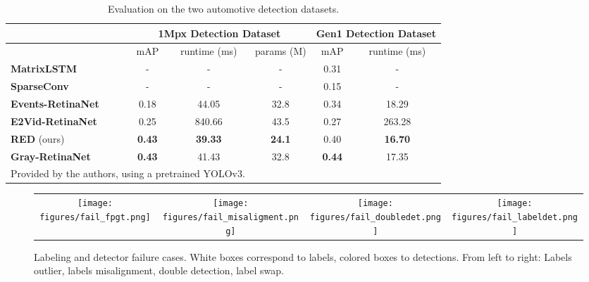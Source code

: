 \documentclass{article}
\begin{document}
\begin{table}[htpb]
\vspace{-3mm}
	\caption{Evaluation on the two automotive detection datasets.}
	\begin{center}
		\tabcolsep=0.11cm
		\begin{tabular}{l ccc |cc}
			\toprule
			& \multicolumn{3}{c}{1Mpx Detection Dataset} & \multicolumn{2}{c}{Gen1 Detection Dataset}\\
			\hline
			                                                                      & {mAP}  & runtime (ms) & params (M)  & {mAP}  & runtime (ms) \\
			\hline
\textbf{MatrixLSTM}~\cite{cannici2020matrix}                          & -      & -       & -           &   0.31     & - \\\textbf{SparseConv}~\cite{messikommer2020event}                       & -      & -       & -           &   0.15     & - \\
			\textbf{Events-RetinaNet}                                             & 0.18   & 44.05    & 32.8       &   0.34     & 18.29 \\
			\textbf{E2Vid-RetinaNet}                                              & 0.25   & 840.66   & 43.5       &   0.27     & 263.28 \\
			\textbf{RED} (ours)                                                   & \textbf{0.43}   & \textbf{39.33}    & \textbf{24.1}       &   0.40     &\textbf{16.70} \\
			\hline
			\textbf{Gray-RetinaNet}                                               & \textbf{0.43}   & 41.43    & 32.8        &  \textbf{0.44}    & 17.35 \\
			\bottomrule
			\multicolumn{3}{l}{\small{ Provided by the authors, using a pretrained YOLOv3.}}
		\end{tabular}\end{center}
 	\vspace{-4mm}
	\label{tab:results}
\end{table}
\begin{figure*}[t]
    \centering
      \begin{tabular}{@{}c@{}c@{}c@{}c}
        \texttt{[image: figures/fail\_fpgt.png]}&
        \texttt{[image: figures/fail\_misaligment.png]}&
        \texttt{[image: figures/fail\_doubledet.png]}&
        \texttt{[image: figures/fail\_labeldet.png]}
	\end{tabular}
    \caption{Labeling and detector failure cases. White boxes correspond to labels, colored boxes to detections. From left to right: Labels outlier, labels misalignment, double detection, label swap.}
    \vspace{-2mm}
\label{fig:failure_cases}
\end{figure*}
\vspace{-1mm}
\end{document}
